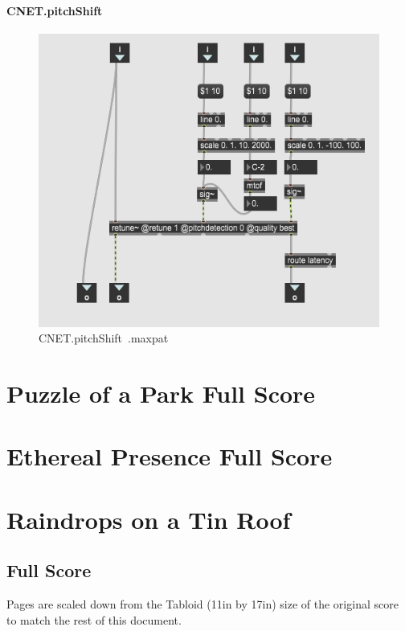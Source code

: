 \subsubsection{CNET.pitchShift~}

\begin{figure}
    \centering
    \includegraphics{diagrams/maxPatches/CNET.pitchShift~.png}
    \caption{CNET.pitchShift~.maxpat}
    \label{fig:pitchshift}
\end{figure}


\chapter{Puzzle of a Park Full Score}



\chapter{Ethereal Presence Full Score}



\chapter{Raindrops on a Tin Roof}

\section{Full Score}
Pages are scaled down from the Tabloid (11in by 17in) size of the original score to match the rest of this document. 

